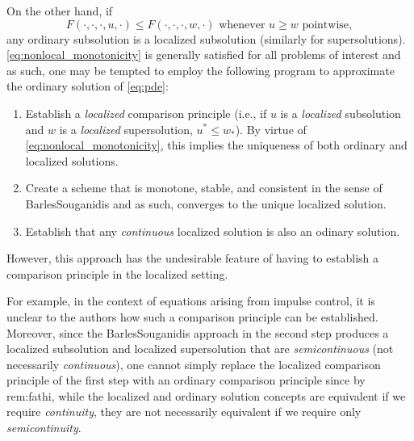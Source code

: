 \documentclass[12pt]{article}
\begin{document}
On the other hand, if
\begin{equation}
F(\cdot,\cdot,\cdot,u,\cdot){\leqslant} F(\cdot,\cdot,\cdot,w,\cdot)\text{ whenever }u{\geqslant} w\text{ pointwise},\label{eq:nonlocal_monotonicity}
\end{equation}
any ordinary subsolution is a localized
subsolution (similarly for supersolutions). \eqref{eq:nonlocal_monotonicity}
is generally satisfied for all problems of interest and as such, one
may be tempted to employ the following program to approximate the
ordinary solution of \eqref{eq:pde}:
\begin{enumerate}
\item Establish a \emph{localized }comparison principle (i.e., if $u$ is
a \emph{localized} subsolution and $w$ is a \emph{localized} supersolution,
$u^{*}{\leqslant} w_{*}$). By virtue of \eqref{eq:nonlocal_monotonicity},
this implies the uniqueness of both ordinary and localized solutions.
\item Create a scheme that is monotone, stable, and consistent in the sense
of Barles\textendash Souganidis and as such, converges to the unique
localized solution.
\item Establish that any \emph{continuous} localized solution is also an
odinary solution.
\end{enumerate}
However, this approach has the undesirable feature of having to establish
a comparison principle in the localized setting.

For example, in the context of equations arising from impulse control,
it is unclear to the authors how such a comparison principle can be
established. Moreover, since the Barles\textendash Souganidis approach
in the second step produces a localized subsolution and localized
supersolution that are \emph{semicontinuous} (not necessarily \emph{continuous}),
one cannot simply replace the localized comparison principle of the
first step with an ordinary comparison principle since by {\prettyref}{rem:fathi},
while the localized and ordinary solution concepts are equivalent
if we require \emph{continuity}, they are not necessarily equivalent
if we require only \emph{semicontinuity}.
\end{document}
